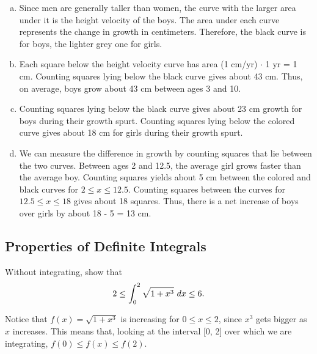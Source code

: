 \begin{enumerate}[1.]
\begin{multicols}{2}
  \begin{Solution}
    \begin{enumerate}[(a)]
    \item Since men are generally taller than women, the curve with
      the larger area under it is the height velocity of the boys.
      The area under each curve represents the change in growth in
      centimeters.  Therefore, the black curve is for boys, the
      lighter grey one for girls.
    \item Each square below the height velocity curve has area (1 cm/yr) $\cdot$
       1 yr = 1 cm. Counting squares lying below the black curve
      gives about 43 cm. Thus, on average, boys grow about 43 cm
      between ages 3 and 10.
    \item Counting squares lying below the black curve gives about 23
      cm growth for boys during their growth spurt. Counting squares
      lying below the colored curve gives about 18 cm for girls during
      their growth spurt.
    \item We can measure the difference in growth by counting squares
      that lie between the two curves. Between ages 2 and 12.5, the
      average girl grows faster than the average boy. Counting squares
      yields about 5 cm between the colored and black curves for $2 \le
      x \le 12.5$. Counting squares between the curves for $12.5 \le x \le
      18$ gives about 18 squares.  Thus, there is a net increase of
      boys over girls by about 18 - 5 = 13 cm.
    \end{enumerate}
  \end{Solution}

\end{multicols}

\hrulefill

\subsection*{Properties of Definite Integrals}

\begin{multicols}{2}
\item
  \begin{Question}
    Without integrating, show that $$2 \le \displaystyle \int_0^2 \sqrt{1 + x^3}
    ~dx \le 6.$$
  \end{Question}

  \begin{Solution}
    Notice that $f(x) = \sqrt{1 + x^3}$ is increasing for $0 \le x \le
    2$, since $x^3$ gets bigger as $x$ increases. This means that,
    looking at the interval [0, 2] over which we are integrating,
    $f(0) \le f(x) \le f(2)$. 



\end{Solution}
\end{multicols}
\end{enumerate}
